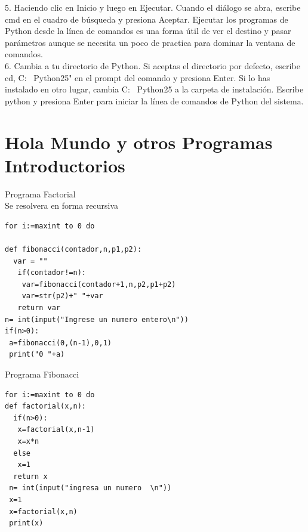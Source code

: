\documentclass[11pt]{article} %
\begin{document}
5.	Haciendo clic en Inicio y luego en Ejecutar. Cuando el diálogo se abra, escribe cmd en el cuadro de búsqueda y presiona Aceptar. Ejecutar los programas de Python desde la línea de comandos es una forma útil de ver el destino y pasar parámetros aunque se necesita un poco de practica para dominar la ventana de comandos.\\

6.	Cambia a tu directorio de Python. Si aceptas el directorio por defecto, escribe cd,  C: \ Python25" en el prompt del comando y presiona Enter. Si lo has instalado en otro lugar, cambia C: \ Python25 a la carpeta de instalación. Escribe python y presiona Enter para iniciar la línea de comandos de Python del sistema.\\


\section{Hola Mundo y otros Programas Introductorios}

 Programa Factorial
  \\  
 Se resolvera en forma recursiva


\lstset{language=Pascal}          %

\begin{lstlisting}[frame=single]  % Start your code-block
for i:=maxint to 0 do

def fibonacci(contador,n,p1,p2):
  var = ""
   if(contador!=n):
   	var=fibonacci(contador+1,n,p2,p1+p2)
   	var=str(p2)+" "+var
   return var
n= int(input("Ingrese un numero entero\n"))
if(n>0):
 a=fibonacci(0,(n-1),0,1)
 print("0 "+a)  
\end{lstlisting}


\newpage
 Programa Fibonacci

\begin{lstlisting}[frame=single]  % Start your code-block
for i:=maxint to 0 do
def factorial(x,n):
  if(n>0):
   x=factorial(x,n-1)
   x=x*n
  else
   x=1
  return x
 n= int(input("ingresa un numero  \n"))
 x=1
 x=factorial(x,n)
 print(x)
\end{lstlisting}
\end{document}
